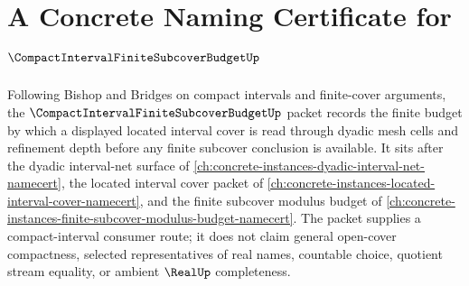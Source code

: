 \chapter{A Concrete Naming Certificate for $\CompactIntervalFiniteSubcoverBudgetUp$}
\label{ch:concrete-instances-compact-interval-finite-subcover-budget-namecert}

Following Bishop and Bridges on compact intervals and finite-cover arguments, the $\CompactIntervalFiniteSubcoverBudgetUp$ packet records the finite budget by which a displayed located interval cover is read through dyadic mesh cells and refinement depth before any finite subcover conclusion is available. It sits after the dyadic interval-net surface of \autoref{ch:concrete-instances-dyadic-interval-net-namecert}, the located interval cover packet of \autoref{ch:concrete-instances-located-interval-cover-namecert}, and the finite subcover modulus budget of \autoref{ch:concrete-instances-finite-subcover-modulus-budget-namecert}. The packet supplies a compact-interval consumer route; it does not claim general open-cover compactness, selected representatives of real names, countable choice, quotient stream equality, or ambient $\RealUp$ completeness.

